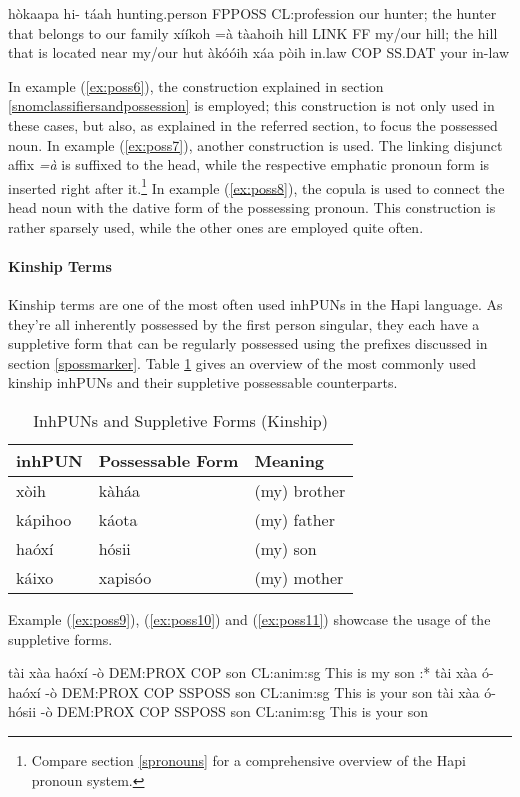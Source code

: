 \documentclass[a4paper, 12pt, oneside]{memoir}
\newcommand{\emh}[1]{\textit{#1}}
\begin{document}
\begin{examples}
\ex 
\label{ex:poss6}
\bits hòkaapa hi- táah
\gloss hunting.person FPPOSS CL:profession
\tr our hunter; the hunter that belongs to our family
\ex
\label{ex:poss7}
\bits xííkoh =à tàahoih
\gloss hill LINK FF
\tr my/our hill; the hill that is located near my/our hut
\ex
\label{ex:poss8}
\bits àkóóih xáa pòih
\gloss in.law COP SS.DAT
\tr your in-law
\end{examples}
In example (\ref{ex:poss6}), the construction explained in section \ref{snomclassifiersandpossession} is employed; this construction is not only used in these cases, but also, as explained in the referred section, to focus the possessed noun. In example (\ref{ex:poss7}), another construction is used. The linking disjunct affix \emh{=à} is suffixed to the head, while the respective emphatic pronoun form is inserted right after it.\footnote{Compare section \ref{spronouns} for a comprehensive overview of the Hapi pronoun system.}
In example (\ref{ex:poss8}), the copula is used to connect the head noun with the dative form of the possessing pronoun. This construction is rather sparsely used, while the other ones are employed quite often. 
\paragraph{Kinship Terms}
Kinship terms are one of the most often used inhPUNs in the Hapi language. As they're all inherently possessed by the first person singular, they each have a suppletive form that can be regularly possessed using the prefixes discussed in section \ref{spossmarker}. Table \ref{t:kinship} gives an overview of the most commonly used kinship inhPUNs and their suppletive possessable counterparts. 
\begin{table}[H]
\centering
\begin{tabular}{@{}lll@{}}
\toprule
inhPUN & Possessable Form & Meaning \\ \midrule
xòih & kàháa & (my) brother \\
kápihoo & káota & (my) father \\
haóxí & hósii & (my) son \\
káixo & xapisóo & (my) mother \\ \bottomrule
\end{tabular}
\caption{InhPUNs and Suppletive Forms (Kinship)}
\label{t:kinship}
\end{table}
Example (\ref{ex:poss9}), (\ref{ex:poss10}) and (\ref{ex:poss11}) showcase the usage of the suppletive forms. 
\begin{examples}
\ex
\label{ex:poss9}
\bits tài xàa haóxí -ò
\gloss DEM:PROX COP son CL:anim:sg
\tr This is my son
\ex
\label{ex:poss10}
\bits:* tài xàa ó- haóxí -ò
\gloss DEM:PROX COP SSPOSS son CL:anim:sg
\intended This is your son
\ex
\label{ex:poss11}
\bits tài xàa ó- hósii -ò
\gloss DEM:PROX COP SSPOSS son CL:anim:sg
\tr This is your son
\end{examples}
\end{document}
